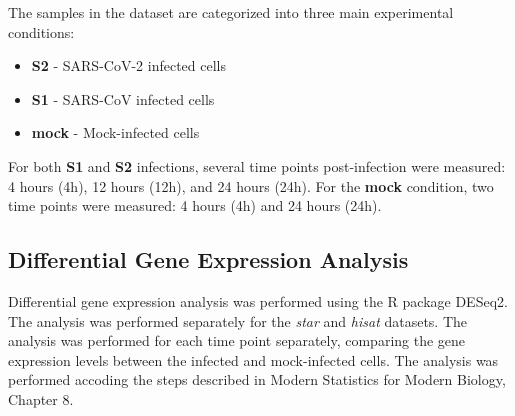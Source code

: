\documentclass{article}
\begin{document}
    The samples in the dataset are categorized into three main experimental conditions:
    \begin{itemize}
        \item \textbf{S2} - SARS-CoV-2 infected cells
        \item \textbf{S1} - SARS-CoV infected cells
        \item \textbf{mock} - Mock-infected cells
    \end{itemize}

    For both \textbf{S1} and \textbf{S2} infections, several time points post-infection were measured: 4 hours (4h), 12 hours (12h), and 24 hours (24h). For the \textbf{mock} condition, two time points were measured: 4 hours (4h) and 24 hours (24h).

    \subsection{Differential Gene Expression Analysis} \label{subsec:differential-gene-expression-analysis}
    Differential gene expression analysis was performed using the R package DESeq2\cite{love_huber_anders_2014}. The analysis was performed separately for the \textit{star} and \textit{hisat} datasets. The analysis was performed for each time point separately, comparing the gene expression levels between the infected and mock-infected cells. The analysis was performed accoding the steps described in Modern Statistics for Modern Biology, Chapter 8\cite{holmes_huber_2018}.
\end{document}
